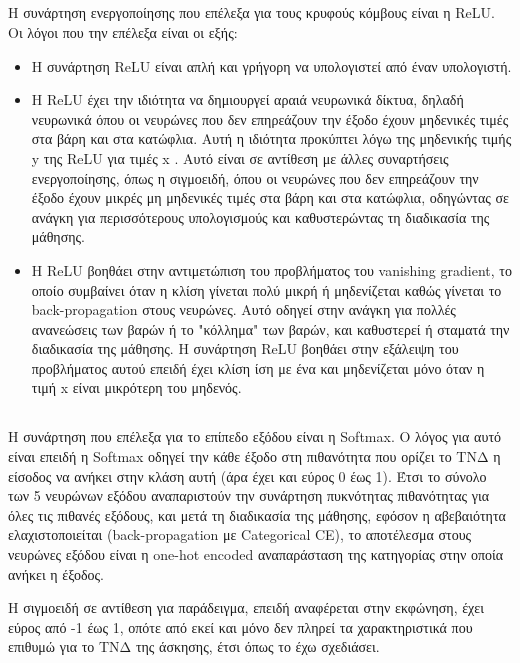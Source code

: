 \documentclass[12pt,a4paper]{article}
\begin{document}
\subsection{}
Η συνάρτηση ενεργοποίησης που επέλεξα για τους κρυφούς κόμβους είναι η ReLU. Οι λόγοι που την επέλεξα είναι οι εξής:
\begin{itemize}
    \item Η συνάρτηση ReLU είναι απλή και γρήγορη να υπολογιστεί από έναν υπολογιστή.
    \item H ReLU έχει την ιδιότητα να δημιουργεί αραιά νευρωνικά δίκτυα, δηλαδή νευρωνικά όπου οι νευρώνες που δεν επηρεάζουν την έξοδο έχουν μηδενικές τιμές στα βάρη και στα κατώφλια. Αυτή η ιδιότητα προκύπτει λόγω της μηδενικής τιμής y της ReLU για τιμές x . Αυτό είναι σε αντίθεση με άλλες συναρτήσεις ενεργοποίησης, όπως η σιγμοειδή, όπου οι νευρώνες που δεν επηρεάζουν την έξοδο έχουν μικρές μη μηδενικές τιμές στα βάρη και στα κατώφλια, οδηγώντας σε ανάγκη για περισσότερους υπολογισμούς και καθυστερώντας τη διαδικασία της μάθησης.
    \item Η ReLU βοηθάει στην αντιμετώπιση του προβλήματος του vanishing gradient, το οποίο συμβαίνει όταν η κλίση γίνεται πολύ μικρή ή μηδενίζεται καθώς γίνεται το back-propagation στους νευρώνες. Αυτό οδηγεί στην ανάγκη για πολλές ανανεώσεις των βαρών ή το "κόλλημα" των βαρών, και καθυστερεί ή σταματά την διαδικασία της μάθησης. Η συνάρτηση ReLU βοηθάει στην εξάλειψη του προβλήματος αυτού επειδή έχει κλίση ίση με ένα και μηδενίζεται μόνο όταν η τιμή x είναι μικρότερη του μηδενός.
\end{itemize}

\subsection{}
Η συνάρτηση που επέλεξα για το επίπεδο εξόδου είναι η Softmax. Ο λόγος για αυτό είναι επειδή η Softmax οδηγεί την κάθε έξοδο στη πιθανότητα που ορίζει το ΤΝΔ η είσοδος να ανήκει στην κλάση αυτή (άρα έχει και εύρος 0 έως 1). Έτσι το σύνολο των 5 νευρώνων εξόδου αναπαριστούν την συνάρτηση πυκνότητας πιθανότητας για όλες τις πιθανές εξόδους, και μετά τη διαδικασία της μάθησης, εφόσον η αβεβαιότητα ελαχιστοποιείται (back-propagation με Categorical CE), το αποτέλεσμα στους νευρώνες εξόδου είναι η one-hot encoded αναπαράσταση της κατηγορίας στην οποία ανήκει η έξοδος.

Η σιγμοειδή σε αντίθεση για παράδειγμα, επειδή αναφέρεται στην εκφώνηση, έχει εύρος από -1 έως 1, οπότε από εκεί και μόνο δεν πληρεί τα χαρακτηριστικά που επιθυμώ για το ΤΝΔ της άσκησης, έτσι όπως το έχω σχεδιάσει.
\end{document}
